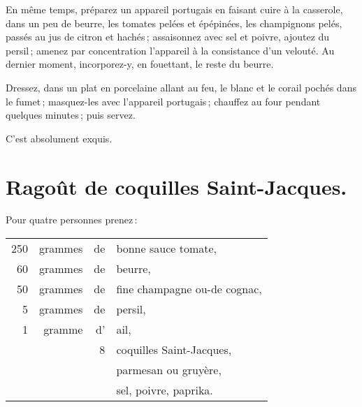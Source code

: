 En même temps, préparez un appareil portugais en faisant cuire à la casserole,
dans un peu de beurre, les tomates pelées et épépinées, les champignons pelés,
passés au jus de citron et hachés ; assaisonnez avec sel et poivre, ajoutez du
persil ; amenez par concentration l'appareil à la consistance d'un velouté. Au
dernier moment, incorporez-y, en fouettant, le reste du beurre.

Dressez, dans un plat en porcelaine allant au feu, le blanc et le corail pochés
dans le fumet ; masquez-les avec l'appareil portugais ; chauffez au four pendant
quelques minutes ; puis servez.

C'est absolument exquis.

\section*{\centering Ragoût de coquilles Saint-Jacques.}

Pour quatre personnes prenez :

\medskip

\footnotesize
\begin{longtable}{rrrp{16em}}
    250 & grammes & de & bonne sauce tomate,                                                              \\
     60 & grammes & de & beurre,                                                                          \\
     50 & grammes & de & fine champagne ou-de cognac,                                                     \\
      5 & grammes & de & persil,                                                                          \\
      1 & gramme  & d’ & ail,                                                                             \\
        &         &  8 & coquilles Saint-Jacques,                                                         \\
        &         &    & parmesan ou gruyère,                                                             \\
        &         &    & sel, poivre, paprika.                                                            \\
\end{longtable}
\normalsize

